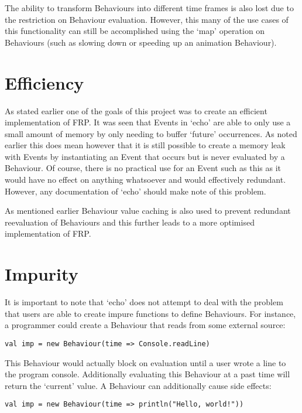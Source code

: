     The ability to transform Behaviours into different time frames is also lost due to the restriction on Behaviour
    evaluation. However, this many of the use cases of this functionality can still be accomplished using the
    `map' operation on Behaviours (such as slowing down or speeding up an animation Behaviour).
    
  \section{Efficiency}
    As stated earlier one of the goals of this project was to create an efficient implementation
    of FRP. It was seen that Events in `echo' are able to only use a small amount of memory by only
    needing to buffer `future' occurrences. As noted earlier this does mean however that it is still
    possible to create a memory leak with Events by instantiating an Event that occurs but is never 
    evaluated by a Behaviour. Of course, there is no practical use for an Event such as this as
    it would have no effect on anything whatsoever and would effectively redundant. However, any documentation
    of `echo' should make note of this problem.
    
    As mentioned earlier Behaviour value caching is also used to prevent redundant reevaluation of Behaviours
    and this further leads to a more optimised implementation of FRP.
  
  \section{Impurity}
    It is important to note that `echo' does not attempt to deal with the problem that
    users are able to create impure functions to define Behaviours. For instance, a programmer could
    create a Behaviour that reads from some external source:

\begin{verbatim}
val imp = new Behaviour(time => Console.readLine)
\end{verbatim}    

    This Behaviour would actually block on evaluation until a user wrote a line to the program console. 
    Additionally evaluating this Behaviour at a past time will return the `current' value. A
    Behaviour can additionally cause side effects:

\begin{verbatim}    
val imp = new Behaviour(time => println("Hello, world!"))
\end{verbatim}

